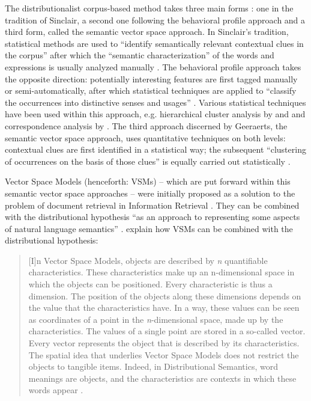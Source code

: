 The distributionalist corpus-based method takes three main forms \citep[242--243]{riemer_sense_2016}: one in the tradition of Sinclair, a second one following the behavioral profile approach and a third form, called the semantic vector space approach. In Sinclair’s tradition, statistical methods are used to “identify semantically relevant contextual clues in the corpus” \citep[242]{riemer_sense_2016} after which the “semantic characterization” of the words and expressions is usually analyzed manually \citep[242]{riemer_sense_2016}. The behavioral profile approach takes the opposite direction: potentially interesting features are first tagged manually or semi-automatically, after which statistical techniques are applied to “classify the occurrences into distinctive senses and usages” \citep[243]{riemer_sense_2016}. Various statistical techniques have been used within this approach, e.g. hierarchical cluster analysis by \citet{Gries2006b} and \citet{divjak_structuring_2010} and correspondence analysis by \citet{glynn_empirical_2010} \citep[243]{riemer_sense_2016}. The third approach discerned by Geeraerts, the semantic vector space approach, uses quantitative techniques on both levels: contextual clues are first identified in a statistical way; the subsequent “clustering of occurrences on the basis of those clues” is equally carried out statistically \citep[243]{riemer_sense_2016}.

Vector Space Models (henceforth: VSMs) – which are put forward within this semantic vector space approaches – were initially proposed as a solution to the problem of document retrieval in Information Retrieval \citep[495]{lappin_vector_2015}. They can be combined with the distributional hypothesis “as an approach to representing some aspects of natural language semantics” \citep[141]{turney_frequency_2010}. \citet[212]{szmrecsanyi_semantic_2014} explain how VSMs can be combined with the distributional hypothesis:

\begin{quote}
[I]n Vector Space Models, objects are described by \textit{n} quantifiable characteristics. These characteristics make up an n{}-dimensional space in which the objects can be positioned. Every characteristic is thus a dimension. The position of the objects along these dimensions depends on the value that the characteristics have. In a way, these values can be seen as coordinates of a point in the \textit{n}{}-dimensional space, made up by the characteristics. The values of a single point are stored in a so-called vector. Every vector represents the object that is described by its characteristics. The spatial idea that underlies Vector Space Models does not restrict the objects to tangible items. Indeed, in Distributional Semantics, word meanings are objects, and the characteristics are contexts in which these words appear \citep[212]{szmrecsanyi_semantic_2014}.
\end{quote}

